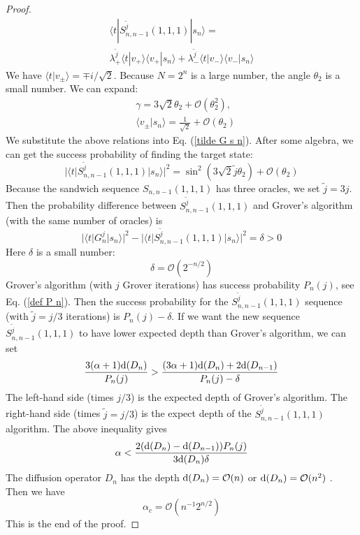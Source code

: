 \documentclass[%
 twocolumn,
 10pt,
 superscriptaddress,
 longbibliography,
 amsmath,amssymb,
 aps,
 pra,
floatfix,
]{revtex4-1}
\begin{document}
\begin{proof}
	\begin{multline}
		\label{tilde G s n}
		\langle t|S^{\tilde j}_{n,n-1}(1,1,1)|s_n\rangle= \\ \lambda_+^{\tilde j}\langle t|v_+\rangle\langle v_+|s_n\rangle+\lambda_-^{\tilde j}\langle t|v_-\rangle\langle v_-|s_n\rangle
	\end{multline}
	We have $\langle t|v_\pm\rangle = \mp i /\sqrt 2$. Because $N=2^n$ is a large number, the angle $\theta_2$ is a small number. We can expand:
	\begin{subequations}
		\begin{align}
			 & \gamma= 3\sqrt 2 \theta_2+\mathcal O\left(\theta^2_2\right),                  \\
			 & \langle v_\pm|s_n\rangle = \frac 1 {\sqrt 2} +\mathcal O\left(\theta_2\right)
		\end{align}
	\end{subequations}
	We substitute the above relations into Eq. (\ref{tilde G s n}). After some algebra, we can get the success probability of finding the target state:
	\begin{equation}
		|\langle t|S^{\tilde j}_{n,n-1}(1,1,1)|s_n\rangle|^2 = \sin^2\left(3\sqrt 2\tilde j\theta_2\right)+\mathcal O(\theta_2)
	\end{equation}
	Because the sandwich sequence $S_{n,n-1}(1,1,1)$ has three oracles, we set $\tilde j=3j$. Then the probability difference between $S^{\tilde j}_{n,n-1}(1,1,1)$ and Grover's algorithm (with the same number of oracles) is
	\begin{equation}
		|\langle t|G^j_n|s_n\rangle|^2 -|\langle t|S^{\tilde j}_{n,n-1}(1,1,1)|s_n\rangle|^2=\delta>0
	\end{equation}
	Here $\delta$ is a small number:
	\begin{equation}
		\delta = \mathcal O(2^{-n/2})
	\end{equation}
	Grover's algorithm (with $j$ Grover iterations) has success probability $P_n(j)$, see Eq. (\ref{def P n}).
	Then the success probability for the $S^{\tilde j}_{n,n-1}(1,1,1)$ sequence (with $\tilde j=j/3$ iterations) is $P_n(j)-\delta$. If we want the new sequence $S^{\tilde j}_{n,n-1}(1,1,1)$ to have lower expected depth than Grover's algorithm, we can set
	\begin{equation}
		\frac{3(\alpha+1)\text d(D_n)}{P_n(j)}>\frac{(3\alpha+1)\text d(D_n)+2\text d(D_{n-1})}{P_n(j)-\delta}
	\end{equation}
	The left-hand side (times $j/3$) is the expected depth of Grover's algorithm. The right-hand side (times $\tilde j=j/3$) is the expect depth of the $S^{\tilde j}_{n,n-1}(1,1,1)$ algorithm. The above inequality gives
	\begin{equation}
		\alpha < \frac{2(\text d(D_n)-\text d(D_{n-1}))P_n(j)}{3\text d(D_n)\delta}
	\end{equation}
	The diffusion operator $D_n$ has the depth $\text d(D_n) = \mathcal O(n)$ or $\text d(D_n) = \mathcal O(n^2)$ \cite{BBCDMSSSW95}. Then we have
	\begin{equation}
		\alpha_c = \mathcal O(n^{-1}2^{n/2})
	\end{equation}
	This is the end of the proof.
\end{proof}
\end{document}
